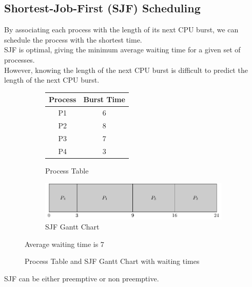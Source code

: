 \documentclass[oneside]{book}
\begin{document}
            \subsection{Shortest-Job-First (SJF) Scheduling}
                By associating each process with the length of its next CPU burst, we can schedule the process
                with the shortest time.\\
                SJF is optimal, giving the minimum average waiting time for a given set of processes.\\
                However, knowing the length of the next CPU burst is difficult to predict the length of the next
                CPU burst.\\
                \begin{figure}[H]
                    \centering
                    \begin{subfigure}{0.5\linewidth}
                        \centering
                        \begin{tabular}{cc}
                            Process & Burst Time\\
                            \toprule
                            P1 & 6\\
                            P2 & 8\\
                            P3 & 7\\
                            P4 & 3\\
                        \end{tabular}
                        \caption{Process Table}
                    \end{subfigure}%
                    \begin{subfigure}{0.5\linewidth}
                        \centering
                        \includegraphics[width=\linewidth]{figures/sjf_gantt_1.pdf}
                        \caption{SJF Gantt Chart}
                    \end{subfigure}
                    Average waiting time is 7
                    \caption{Process Table and SJF Gantt Chart with waiting times}
                \end{figure}
                SJF can be either preemptive or non preemptive.\\
\end{document}
